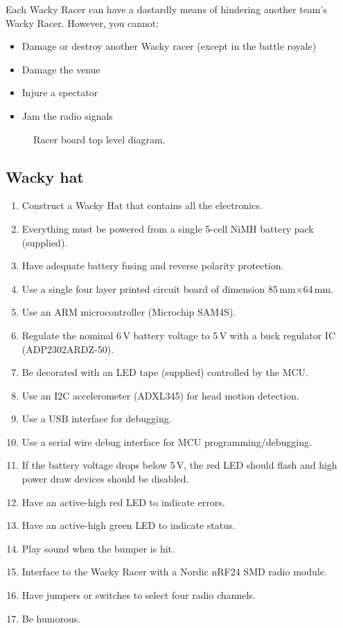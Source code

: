 \documentclass[11pt, a4paper]{article}
\begin{document}
Each Wacky Racer can have a dastardly means of hindering another
team's Wacky Racer.  However, you cannot:
%
\begin{itemize}
\item Damage or destroy another Wacky racer (except in the battle royale)
\item Damage the venue
\item Injure a spectator
\item Jam the radio signals
\end{itemize}


\vspace{1cm}

\begin{figure}[h]
    \centering
    
    \caption{Racer board top level diagram.}
\end{figure}


\vfill\pagebreak

\subsection{Wacky hat}


\begin{enumerate}
\item Construct a Wacky Hat that contains all the electronics.
\item Everything must be powered from a single 5-cell NiMH battery pack (supplied).
\item Have adequate battery fusing and reverse polarity protection.
\item Use a single four layer printed circuit board of dimension 85\,mm$\times$64\,mm.
\item Use an ARM microcontroller (Microchip SAM4S).
\item Regulate the nominal 6\,V battery voltage to 5\,V with a buck
  regulator IC (ADP2302ARDZ-50).
\item Be decorated with an LED tape (supplied) controlled by the MCU.
\item Use an I2C accelerometer (ADXL345) for head motion detection.
\item Use a USB interface for debugging.
\item Use a serial wire debug interface for MCU programming/debugging.
\item If the battery voltage drops below 5\,V, the red LED should flash and high power draw devices should be disabled.
\item Have an active-high red LED to indicate errors.
\item Have an active-high green LED to indicate status.
\item Play sound when the bumper is hit.
\item Interface to the Wacky Racer with a Nordic nRF24 SMD radio module.
\item Have jumpers or switches to select four radio channels.
\item Be humorous.
\end{enumerate}
\end{document}
